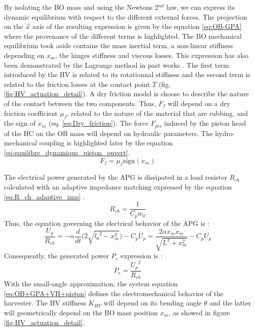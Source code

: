 \documentclass[3p,twocolumn,preprint]{elsarticle}
\begin{document}
By isolating the BO mass and using the Newtons 2$^{nd}$ law, we can express its dynamic equilibrium with respect to the different external forces. The projection on the $\vec{x}$ axis of the resulting expression is given by the equation \ref{eq:OB-GPA} where the provenance of the different terms is highlighted. The BO mechanical equilibrium took aside contains the mass inertial term, a non-linear stiffness depending on $x_m$, the hinges stiffness and viscous losses. This expression has also been demonstrated by the Lagrange method in past works \cite{Liu2013}. The first term introduced by the HV is related to its rotationnal stiffness and the second term is related to the friction losses at the contact point $T$ (fig. \ref{fig:HV_actuation_detail}). A dry friction model is choose to describe the nature of the contact between the two components. Thus, $F_f$ will depend on a dry friction coefficient $\mu_f$, related to the nature of the material that are rubbing, and the sign of $\dot{x}_m$ (eq. \ref{eq:Dry_friction}). The force $F_{pis}$ induced by the piston head of the HC on the OB mass will depend on hydraulic parameters. The hydro-mechanical coupling is highlighted later by the equation \ref{eq:equilibre_dynamique_piston_ouvert}.
\begin{equation}
	F_f = \mu_f \text{sign}(\dot{x}_m)
	\label{eq:Dry_friction}
\end{equation}

The electrical power generated by the APG is dissipated in a load resistor $R_{ch}$ calculated with an adaptive impedance matching expressed by the equation \ref{eq:R_ch_adaptive_imp} \cite{Liu2013}. 
\begin{equation}
	R_{ch} = \dfrac{1}{C_p w_0}
	\label{eq:R_ch_adaptive_imp}
\end{equation}
Thus, the equation governing the electrical behavior of the APG is :
\begin{equation}
	\dfrac{U_p}{R_{ch}} = 
	-\alpha\dfrac{d}{dt}\biggl(2\sqrt{{l_0}^2-x_m^2}\biggr)
	- C_p\dot{U_p}
	= \frac{2\alpha x_m\dot{x}_m}{\sqrt{L^2+x_m^2}} - C_p\dot{U_p}
\end{equation}
Consequently, the generated power $P_e$ expression is :
\begin{equation}
	P_e = \frac{{U_p}^2}{R_{ch}} 
	\label{eq:P_e}
\end{equation} 
With the small-angle approximation, the system equation \ref{eq:OB+GPA+VH+piston} defines the electromechanical behavior of the harvester. The HV stiffness $K_{HV}$ will depend on its bending angle $\theta$ and the latter will geometrically depend on the BO mass position $x_m$, as showed in figure \ref{fig:HV_actuation_detail}.
\end{document}
